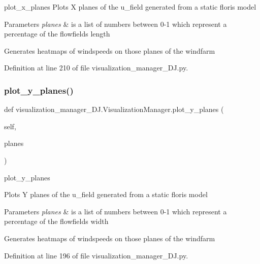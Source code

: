 plot\+\_\+x\+\_\+planes Plots X planes of the u\+\_\+field generated from a static floris model 


\begin{DoxyParams}{Parameters}
{\em planes} & is a list of numbers between 0-\/1 which represent a percentage of the flowfield\textquotesingle{}s length\\
\hline
\end{DoxyParams}
Generates heatmaps of windspeeds on those planes of the windfarm 

Definition at line 210 of file visualization\+\_\+manager\+\_\+\+D\+J.\+py.

\mbox{\label{classvisualization__manager___d_j_1_1_visualization_manager_ab0047d9eeda14999bdf8f8de191d9a33}} 
\subsubsection{\texorpdfstring{plot\+\_\+y\+\_\+planes()}{plot\_y\_planes()}}
{\footnotesize\ttfamily def visualization\+\_\+manager\+\_\+\+D\+J.\+Visualization\+Manager.\+plot\+\_\+y\+\_\+planes (\begin{DoxyParamCaption}\item[{}]{self,  }\item[{}]{planes }\end{DoxyParamCaption})}



plot\+\_\+y\+\_\+planes 

Plots Y planes of the u\+\_\+field generated from a static floris model


\begin{DoxyParams}{Parameters}
{\em planes} & is a list of numbers between 0-\/1 which represent a percentage of the flowfield\textquotesingle{}s width\\
\hline
\end{DoxyParams}
Generates heatmaps of windspeeds on those planes of the windfarm 

Definition at line 196 of file visualization\+\_\+manager\+\_\+\+D\+J.\+py.

